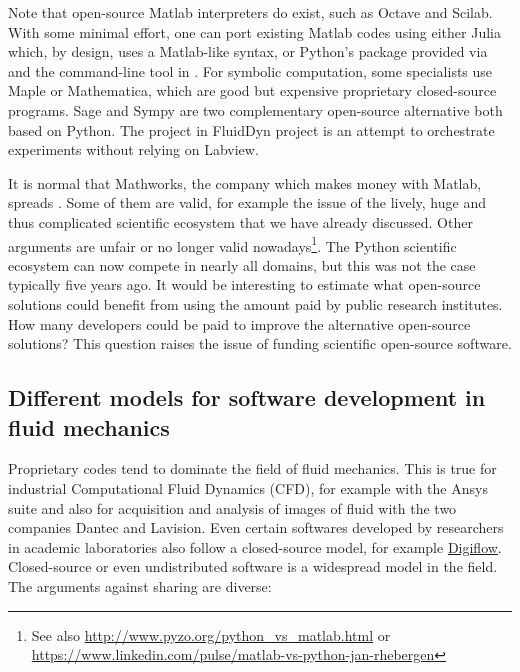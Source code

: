 Note that open-source Matlab interpreters do exist, such as Octave and Scilab.
%
With some minimal effort, one can port existing Matlab codes using either
Julia which, by design, uses a Matlab-like syntax, or Python's 
package provided via  and the command-line tool
 in .
%
For symbolic computation, some specialists use Maple or Mathematica, which are
good but expensive proprietary closed-source programs.
%
Sage and Sympy are two complementary open-source alternative both based on
Python.
%
The  project in FluidDyn project is an attempt to orchestrate
experiments without relying on Labview.

It is normal that Mathworks, the company which makes money with Matlab, spreads
.  Some of them are valid, for
example the issue of the lively, huge and thus complicated scientific ecosystem
that we have already discussed. Other arguments are unfair or no longer valid
nowadays\footnote{See also \url{http://www.pyzo.org/python\_vs\_matlab.html} or
\url{https://www.linkedin.com/pulse/matlab-vs-python-jan-rhebergen}}.
%
The Python scientific ecosystem can now compete in nearly all domains, but this
was not the case typically five years ago.
%
It would be interesting to estimate what open-source solutions could benefit
from using the amount paid by public research institutes. How many
developers could be paid to improve the alternative open-source solutions?
%
This question raises the issue of funding scientific open-source software.

\subsection{Different models for software development in fluid mechanics}

Proprietary codes tend to dominate the field of fluid mechanics. This is true
for industrial Computational Fluid Dynamics (CFD), for example with the Ansys
suite and also for acquisition and analysis of images of fluid with the
two companies Dantec and Lavision.
%
Even certain softwares developed by researchers in academic laboratories
also follow a closed-source model, for example
\href{http://www.damtp.cam.ac.uk/user/fdl/digiflow/index.htm}{Digiflow}.
%
Closed-source or even undistributed software is a widespread model in the
field.
%
The arguments against sharing are diverse:

